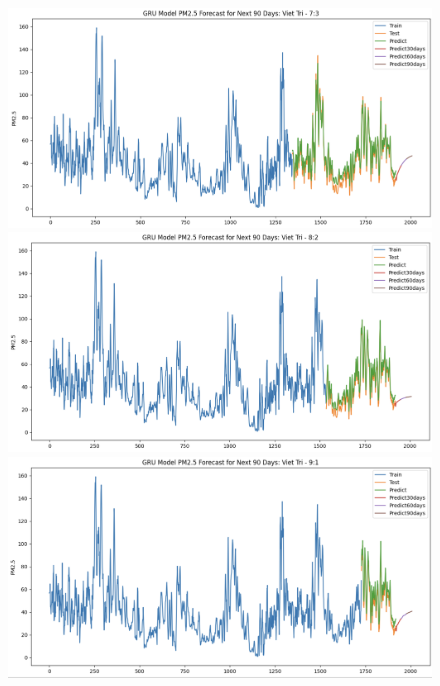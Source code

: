 \begin{figure}[H]
{\begin{adjustbox}{minipage=0.48\textwidth}
\begin{minipage}{0.3\textwidth}
                \centering
                \includegraphics[width=\textwidth]{img/final/GRU/90D/GRU_7_3_VT.png}\\
                \includegraphics[width=\textwidth]{img/final/GRU/90D/GRU_8_2_VT.png}\\
                \includegraphics[width=\textwidth]{img/final/GRU/90D/GRU_9_1_VT.png}
            \end{minipage}
        \end{adjustbox}
    }
\end{figure}

